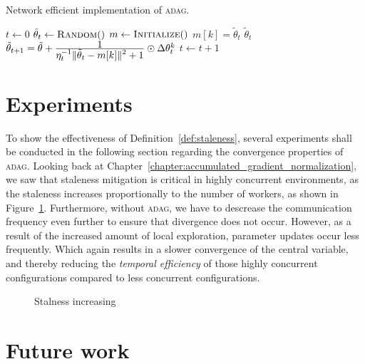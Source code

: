 \begin{algorithm}[H]
  \caption{Network efficient implementation of \textsc{adag}.}
  \label{algo:adag_2}
  \begin{algorithmic}[1]
    \State $t \gets 0$ 
    \State $\tilde{\theta}_t \gets \Call{Random}$
    \State $m \gets \Call{Initialize}$ 
    \State
     
    \State $m[k] = \tilde{\theta}_t$
    \State \Return $\tilde{\theta}_{t}$
    \EndProcedure
    \State
    \State $\tilde{\theta}_{t + 1} = \tilde{\theta} + \frac{\displaystyle 1}{\displaystyle \eta_t^{-1}\|\tilde{\theta}_t - m[k]\|^2 + 1} \odot \Delta\theta^k_t$
    \State $t \gets t + 1$
    \EndProcedure
    \State
    \EndProcedure
  \end{algorithmic}
\end{algorithm}

\section{Experiments}
\label{sec:adag_experiments}

To show the effectiveness of Definition~\ref{def:staleness}, several experiments shall be conducted in the following section regarding the convergence properties of \textsc{adag}. Looking back at Chapter~\ref{chapter:accumulated_gradient_normalization}, we saw that staleness mitigation is critical in highly concurrent environments, as the staleness increases proportionally to the number of workers, as shown in Figure~\ref{fig:staleness_increasing}. Furthermore, without \textsc{adag}, we have to descrease the communication frequency even further to ensure that divergence does not occur. However, as a result of the increased amount of local exploration, parameter updates occur less frequently. Which again results in a slower convergence of the central variable, and thereby reducing the \emph{temporal efficiency} of those highly concurrent configurations compared to less concurrent configurations.

\begin{figure}[H]
  \centering
  \caption{Stalness increasing}
  \label{fig:staleness_increasing}
\end{figure}

\section{Future work}
\label{sec:adag_future_work}
